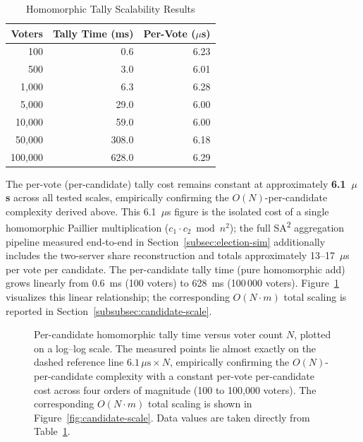 \begin{table}[H]
\centering
\caption{Homomorphic Tally Scalability Results}
\label{tab:tally-scale}
\begin{tabular}{|r|r|r|}
\hline
\textbf{Voters} & \textbf{Tally Time (ms)} & \textbf{Per-Vote ($\mu$s)} \\
\hline
100 & 0.6 & 6.23 \\
\hline
500 & 3.0 & 6.01 \\
\hline
1,000 & 6.3 & 6.28 \\
\hline
5,000 & 29.0 & 6.00 \\
\hline
10,000 & 59.0 & 6.00 \\
\hline
50,000 & 308.0 & 6.18 \\
\hline
100,000 & 628.0 & 6.29 \\
\hline
\end{tabular}
\end{table}

The per-vote (per-candidate) tally cost remains constant at approximately \textbf{6.1~$\mu$s} across all tested scales, empirically confirming the $O(N)$-per-candidate complexity derived above. This 6.1~$\mu$s figure is the isolated cost of a single homomorphic Paillier multiplication ($c_1 \cdot c_2 \bmod n^2$); the full SA\textsuperscript{2} aggregation pipeline measured end-to-end in Section~\ref{subsec:election-sim} additionally includes the two-server share reconstruction and totals approximately 13--17~$\mu$s per vote per candidate. The per-candidate tally time (pure homomorphic add) grows linearly from 0.6~ms (100 voters) to 628~ms (100\,000 voters). Figure~\ref{fig:tally-scale} visualizes this linear relationship; the corresponding $O(N \cdot m)$ total scaling is reported in Section~\ref{subsubsec:candidate-scale}.

\begin{figure}[H]
\centering

\caption[Homomorphic Tally Scaling with Voter Count]{Per-candidate homomorphic tally time versus voter count $N$, plotted on a log--log scale. The measured points lie almost exactly on the dashed reference line $6.1\,\mu\text{s}\times N$, empirically confirming the $O(N)$-per-candidate complexity with a constant per-vote per-candidate cost across four orders of magnitude (100 to 100{,}000 voters). The corresponding $O(N \cdot m)$ total scaling is shown in Figure~\ref{fig:candidate-scale}. Data values are taken directly from Table~\ref{tab:tally-scale}.}
\label{fig:tally-scale}
\end{figure}

